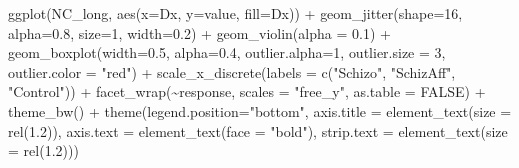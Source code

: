 \documentclass[
  letterpaper,
  10pt,
  krantz2]{krantz}
\makeatletter
\newenvironment{Shaded}{\begin{snugshade}}{\end{snugshade}}
\newcommand{\AttributeTok}[1]{\textcolor[rgb]{0.40,0.45,0.13}{#1}}
\newcommand{\ConstantTok}[1]{\textcolor[rgb]{0.56,0.35,0.01}{#1}}
\newcommand{\DecValTok}[1]{\textcolor[rgb]{0.68,0.00,0.00}{#1}}
\newcommand{\FloatTok}[1]{\textcolor[rgb]{0.68,0.00,0.00}{#1}}
\newcommand{\FunctionTok}[1]{\textcolor[rgb]{0.28,0.35,0.67}{#1}}
\newcommand{\NormalTok}[1]{\textcolor[rgb]{0.00,0.23,0.31}{#1}}
\newcommand{\SpecialCharTok}[1]{\textcolor[rgb]{0.37,0.37,0.37}{#1}}
\newcommand{\StringTok}[1]{\textcolor[rgb]{0.13,0.47,0.30}{#1}}
\newenvironment{kframe}{%
  \medskip{}
  \setlength{\fboxsep}{.8em}
  \def\at@end@of@kframe{}%
  \ifinner\ifhmode%
  \def\at@end@of@kframe{\end{minipage}}%
  \begin{minipage}{\columnwidth}%
  \fi\fi%
  \def\FrameCommand##1{\hskip\@totalleftmargin \hskip-\fboxsep
  \colorbox{shadecolor}{##1}\hskip-\fboxsep
      \hskip-\linewidth \hskip-\@totalleftmargin \hskip\columnwidth}%
  \MakeFramed {\advance\hsize-\width
    \@totalleftmargin\z@ \linewidth\hsize
    \@setminipage}}%
{\par\unskip\endMakeFramed%
  \at@end@of@kframe}
\renewenvironment{Shaded}{\begin{kframe}}{\end{kframe}}
\makeatother
\begin{document}
\begin{Shaded}
\begin{Highlighting}[]
\FunctionTok{ggplot}\NormalTok{(NC\_long, }\FunctionTok{aes}\NormalTok{(}\AttributeTok{x=}\NormalTok{Dx, }\AttributeTok{y=}\NormalTok{value, }\AttributeTok{fill=}\NormalTok{Dx)) }\SpecialCharTok{+}
  \FunctionTok{geom\_jitter}\NormalTok{(}\AttributeTok{shape=}\DecValTok{16}\NormalTok{, }\AttributeTok{alpha=}\FloatTok{0.8}\NormalTok{, }\AttributeTok{size=}\DecValTok{1}\NormalTok{, }\AttributeTok{width=}\FloatTok{0.2}\NormalTok{) }\SpecialCharTok{+}
  \FunctionTok{geom\_violin}\NormalTok{(}\AttributeTok{alpha =} \FloatTok{0.1}\NormalTok{) }\SpecialCharTok{+}
  \FunctionTok{geom\_boxplot}\NormalTok{(}\AttributeTok{width=}\FloatTok{0.5}\NormalTok{, }\AttributeTok{alpha=}\FloatTok{0.4}\NormalTok{, }
               \AttributeTok{outlier.alpha=}\DecValTok{1}\NormalTok{, }\AttributeTok{outlier.size =} \DecValTok{3}\NormalTok{, }\AttributeTok{outlier.color =} \StringTok{"red"}\NormalTok{) }\SpecialCharTok{+}
  \FunctionTok{scale\_x\_discrete}\NormalTok{(}\AttributeTok{labels =} \FunctionTok{c}\NormalTok{(}\StringTok{"Schizo"}\NormalTok{, }\StringTok{"SchizAff"}\NormalTok{, }\StringTok{"Control"}\NormalTok{)) }\SpecialCharTok{+}
  \FunctionTok{facet\_wrap}\NormalTok{(}\SpecialCharTok{\textasciitilde{}}\NormalTok{response, }\AttributeTok{scales =} \StringTok{"free\_y"}\NormalTok{, }\AttributeTok{as.table =} \ConstantTok{FALSE}\NormalTok{) }\SpecialCharTok{+}
  \FunctionTok{theme\_bw}\NormalTok{() }\SpecialCharTok{+}
  \FunctionTok{theme}\NormalTok{(}\AttributeTok{legend.position=}\StringTok{"bottom"}\NormalTok{,}
        \AttributeTok{axis.title =} \FunctionTok{element\_text}\NormalTok{(}\AttributeTok{size =} \FunctionTok{rel}\NormalTok{(}\FloatTok{1.2}\NormalTok{)),}
        \AttributeTok{axis.text  =} \FunctionTok{element\_text}\NormalTok{(}\AttributeTok{face =} \StringTok{"bold"}\NormalTok{),}
        \AttributeTok{strip.text =} \FunctionTok{element\_text}\NormalTok{(}\AttributeTok{size =} \FunctionTok{rel}\NormalTok{(}\FloatTok{1.2}\NormalTok{)))}
\end{Highlighting}
\end{Shaded}
\end{document}
